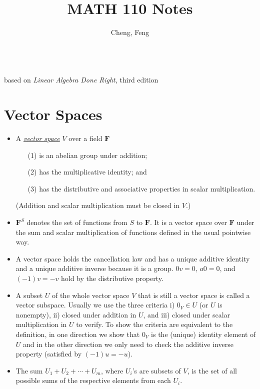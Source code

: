\documentclass[11pt]{article}
\title{MATH 110 Notes}
\author{Cheng, Feng}
\newcommand{\df}[1]{\ul{\textit{\textsf{#1}}}}
\newcommand{\F}{\mathbf{F}}
\begin{document}
\makeatletter
\begin{center}
    {\Large \@title}
    \\based on \textit{Linear Algebra Done Right}, third edition
    \vspace{0.5em}
    \\ \@author
    \vspace{-0.5em}
\end{center}
\makeatother

\tableofcontents
\newpage

\section{Vector Spaces}
\begin{itemize}
    \item A \df{vector space} $V$ over a field $\F$
    \begin{enumerate}
    \item [(1)] is an abelian group under addition;
    \item [(2)] has the multiplicative identity; and
    \item [(3)] has the distributive and associative properties in scalar multiplication.
    \end{enumerate}
    (Addition and scalar multiplication must be closed in $V$.)
    \item $\F^S$ denotes the set of functions from $S$ to $\F$. It is a vector space over $\F$ under the sum and scalar multiplication of functions defined in the usual pointwise way.
    \item A vector space holds the cancellation law and has a unique additive identity and a unique additive inverse because it is a group. $0v = 0$, $a0 = 0$, and $(-1)v = -v$ hold by the distributive property.
    \item A subset $U$ of the whole vector space $V$ that is still a vector space is called a vector subspace. Usually we use the three criteria i) $0_V \in U$ (or $U$ is nonempty), ii) closed under addition in $U$, and iii) closed under scalar multiplication in $U$ to verify. To show the criteria are equivalent to the definition, in one direction we show that $0_V$ is the (unique) identity element of $U$ and in the other direction we only need to check the additive inverse property (satisfied by $(-1)u = -u$).
    \item The sum $U_1 + U_2 +\cdots+ U_m$, where $U_i$'s are subsets of $V$, is the set of all possible sums of the respective elements from each $U_i$.

\end{itemize}
\end{document}
